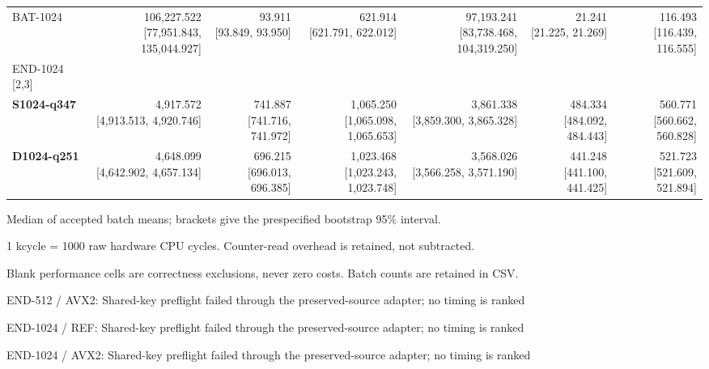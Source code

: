 \begin{table}[t]
{\begin{tabular}{lrrrrrr}
BAT-1024 & \shortstack{106,227.522\\{}[77,951.843, 135,044.927]} & \shortstack{93.911\\{}[93.849, 93.950]} & \shortstack{621.914\\{}[621.791, 622.012]} & \shortstack{97,193.241\\{}[83,738.468, 104,319.250]} & \shortstack{21.241\\{}[21.225, 21.269]} & \shortstack{116.493\\{}[116.439, 116.555]} \\
END-1024 [2,3] &  &  &  &  &  &  \\
\textbf{S1024-q347} & \shortstack{4,917.572\\{}[4,913.513, 4,920.746]} & \shortstack{741.887\\{}[741.716, 741.972]} & \shortstack{1,065.250\\{}[1,065.098, 1,065.653]} & \shortstack{3,861.338\\{}[3,859.300, 3,865.328]} & \shortstack{484.334\\{}[484.092, 484.443]} & \shortstack{560.771\\{}[560.662, 560.828]} \\
\textbf{D1024-q251} & \shortstack{4,648.099\\{}[4,642.902, 4,657.134]} & \shortstack{696.215\\{}[696.013, 696.385]} & \shortstack{1,023.468\\{}[1,023.243, 1,023.748]} & \shortstack{3,568.026\\{}[3,566.258, 3,571.190]} & \shortstack{441.248\\{}[441.100, 441.425]} & \shortstack{521.723\\{}[521.609, 521.894]} \\
\bottomrule
\end{tabular}}
\begin{minipage}{\textwidth}\footnotesize
Median of accepted batch means; brackets give the prespecified bootstrap 95\% interval.\par
1 kcycle = 1000 raw hardware CPU cycles. Counter-read overhead is retained, not subtracted.\par
Blank performance cells are correctness exclusions, never zero costs. Batch counts are retained in CSV.\par
[1] END-512 / AVX2: Shared-key preflight failed through the preserved-source adapter; no timing is ranked\par
[2] END-1024 / REF: Shared-key preflight failed through the preserved-source adapter; no timing is ranked\par
[3] END-1024 / AVX2: Shared-key preflight failed through the preserved-source adapter; no timing is ranked\par
\end{minipage}
\end{table}
